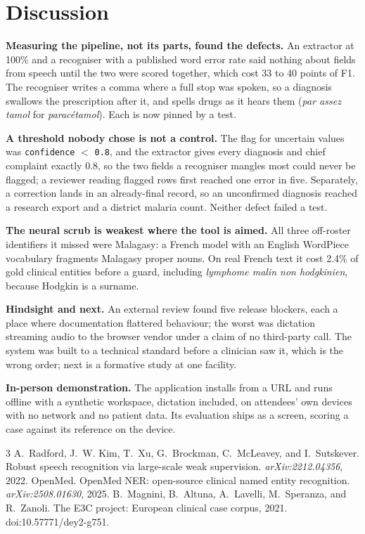 \documentclass[10pt,letterpaper]{article}
\begin{document}
\section{Discussion}

\textbf{Measuring the pipeline, not its parts, found the defects.} An extractor
at 100\% and a recogniser with a published word error rate said nothing about
fields from speech until the two were scored together, which cost 33 to 40
points of F1. The recogniser writes a comma where a full stop was spoken, so a
diagnosis swallows the prescription after it, and spells drugs as it hears them
(\emph{par assez tamol} for \emph{parac\'etamol}). Each is now pinned by a test.

\textbf{A threshold nobody chose is not a control.} The flag for uncertain
values was \texttt{confidence} $<$ \texttt{0.8}, and the extractor gives every
diagnosis and chief complaint exactly 0.8, so the two fields a recogniser
mangles most could never be flagged; a reviewer reading flagged rows first
reached one error in five. Separately, a correction lands in an already-final
record, so an unconfirmed diagnosis reached a research export and a district
malaria count. Neither defect failed a test.

\textbf{The neural scrub is weakest where the tool is aimed.} All three off-roster identifiers it missed were Malagasy: a French model with an
English WordPiece vocabulary fragments Malagasy proper nouns. On real French
text it cost 2.4\% of gold clinical entities before a guard, including
\emph{lymphome malin non hodgkinien}, because Hodgkin is a surname.

\textbf{Hindsight and next.} An external review found five release blockers,
each a place where documentation flattered behaviour; the worst was dictation
streaming audio to the browser vendor under a claim of no third-party call. The
system was built to a technical standard before a clinician saw it, which is
the wrong order; next is a formative study at one facility.

\textbf{In-person demonstration.} The application installs from a URL and runs
offline with a synthetic workspace, dictation included, on attendees' own
devices with no network and no patient data. Its evaluation ships as a screen,
scoring a case against its reference on the device.

\footnotesize
\begin{thebibliography}{3}
\itemsep0pt \parskip0pt
 A.~Radford, J.~W. Kim,
T.~Xu, G.~Brockman, C.~McLeavey, and I.~Sutskever. Robust speech recognition
via large-scale weak supervision. \emph{arXiv:2212.04356}, 2022.
 OpenMed. {OpenMed} {NER}: open-source
clinical named entity recognition. \emph{arXiv:2508.01630}, 2025.
 B.~Magnini, B.~Altuna,
A.~Lavelli, M.~Speranza, and R.~Zanoli. The {E3C} project: European clinical
case corpus, 2021. doi:10.57771/dey2-g751.
\end{thebibliography}
\end{document}
